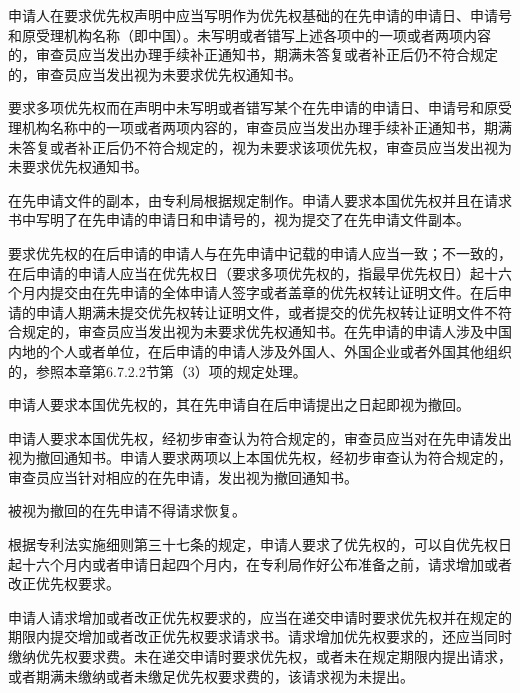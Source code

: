 申请人在要求优先权声明中应当写明作为优先权基础的在先申请的申请日、申请号和原受理机构名称（即中国）。未写明或者错写上述各项中的一项或者两项内容的，审查员应当发出办理手续补正通知书，期满未答复或者补正后仍不符合规定的，审查员应当发出视为未要求优先权通知书。

要求多项优先权而在声明中未写明或者错写某个在先申请的申请日、申请号和原受理机构名称中的一项或者两项内容的，审查员应当发出办理手续补正通知书，期满未答复或者补正后仍不符合规定的，视为未要求该项优先权，审查员应当发出视为未要求优先权通知书。


在先申请文件的副本，由专利局根据规定制作。申请人要求本国优先权并且在请求书中写明了在先申请的申请日和申请号的，视为提交了在先申请文件副本。

要求优先权的在后申请的申请人与在先申请中记载的申请人应当一致；不一致的，在后申请的申请人应当在优先权日（要求多项优先权的，指最早优先权日）起十六个月内提交由在先申请的全体申请人签字或者盖章的优先权转让证明文件。在后申请的申请人期满未提交优先权转让证明文件，或者提交的优先权转让证明文件不符合规定的，审查员应当发出视为未要求优先权通知书。在先申请的申请人涉及中国内地的个人或者单位，在后申请的申请人涉及外国人、外国企业或者外国其他组织的，参照本章第6.7.2.2节第（3）项的规定处理。

申请人要求本国优先权的，其在先申请自在后申请提出之日起即视为撤回。

申请人要求本国优先权，经初步审查认为符合规定的，审查员应当对在先申请发出视为撤回通知书。申请人要求两项以上本国优先权，经初步审查认为符合规定的，审查员应当针对相应的在先申请，发出视为撤回通知书。

被视为撤回的在先申请不得请求恢复。

根据专利法实施细则第三十七条的规定，申请人要求了优先权的，可以自优先权日起十六个月内或者申请日起四个月内，在专利局作好公布准备之前，请求增加或者改正优先权要求。

申请人请求增加或者改正优先权要求的，应当在递交申请时要求优先权并在规定的期限内提交增加或者改正优先权要求请求书。请求增加优先权要求的，还应当同时缴纳优先权要求费。未在递交申请时要求优先权，或者未在规定期限内提出请求，或者期满未缴纳或者未缴足优先权要求费的，该请求视为未提出。

